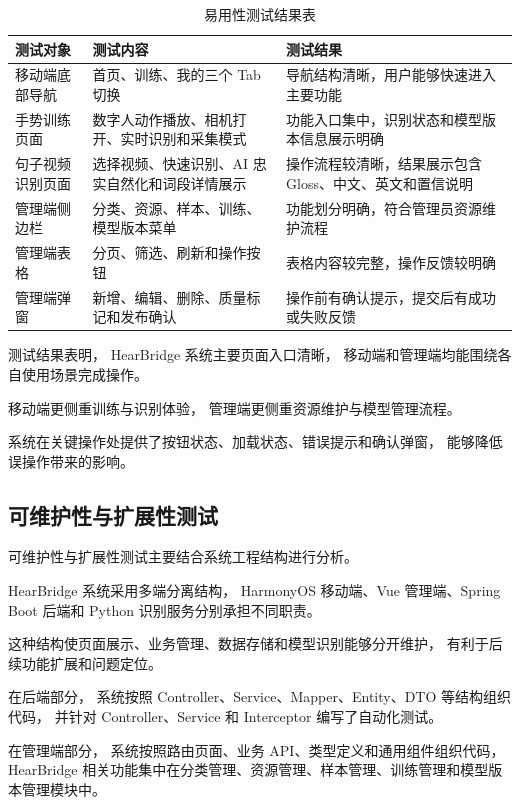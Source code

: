 \begin{longtable}{L{0.22\textwidth} L{0.34\textwidth} L{0.34\textwidth}}
  \caption{易用性测试结果表}
  \label{tab:chapter07-usability-test}\\
  \toprule
  测试对象 & 测试内容 & 测试结果 \\
  \midrule
  移动端底部导航 & 首页、训练、我的三个 Tab 切换 & 导航结构清晰，用户能够快速进入主要功能 \\
  手势训练页面 & 数字人动作播放、相机打开、实时识别和采集模式 & 功能入口集中，识别状态和模型版本信息展示明确 \\
  句子视频识别页面 & 选择视频、快速识别、AI 忠实自然化和词段详情展示 & 操作流程较清晰，结果展示包含 Gloss、中文、英文和置信说明 \\
  管理端侧边栏 & 分类、资源、样本、训练、模型版本菜单 & 功能划分明确，符合管理员资源维护流程 \\
  管理端表格 & 分页、筛选、刷新和操作按钮 & 表格内容较完整，操作反馈较明确 \\
  管理端弹窗 & 新增、编辑、删除、质量标记和发布确认 & 操作前有确认提示，提交后有成功或失败反馈 \\
  \bottomrule
\end{longtable}

测试结果表明，
HearBridge 系统主要页面入口清晰，
移动端和管理端均能围绕各自使用场景完成操作。

移动端更侧重训练与识别体验，
管理端更侧重资源维护与模型管理流程。

系统在关键操作处提供了按钮状态、加载状态、错误提示和确认弹窗，
能够降低误操作带来的影响。

\subsection{可维护性与扩展性测试}

可维护性与扩展性测试主要结合系统工程结构进行分析。

HearBridge 系统采用多端分离结构，
HarmonyOS 移动端、Vue 管理端、Spring Boot 后端和 Python 识别服务分别承担不同职责。

这种结构使页面展示、业务管理、数据存储和模型识别能够分开维护，
有利于后续功能扩展和问题定位。

在后端部分，
系统按照 Controller、Service、Mapper、Entity、DTO 等结构组织代码，
并针对 Controller、Service 和 Interceptor 编写了自动化测试。

在管理端部分，
系统按照路由页面、业务 API、类型定义和通用组件组织代码，
HearBridge 相关功能集中在分类管理、资源管理、样本管理、训练管理和模型版本管理模块中。

